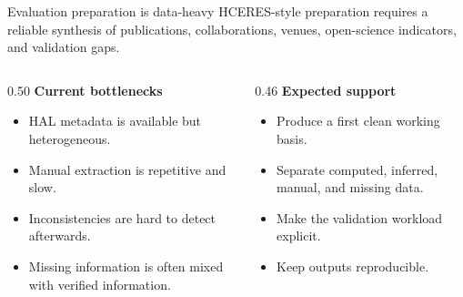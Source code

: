 \begin{frame}[t]

  \begin{block}{Evaluation preparation is data-heavy}
    HCERES-style preparation requires a reliable synthesis of publications, collaborations, venues, open-science indicators, and validation gaps.
  \end{block}

  \vspace{0.3cm}

  \begin{columns}[T,onlytextwidth]
    \begin{column}{0.50\textwidth}
      \textbf{Current bottlenecks}
      \begin{itemize}
        \item HAL metadata is available but heterogeneous.
        \item Manual extraction is repetitive and slow.
        \item Inconsistencies are hard to detect afterwards.
        \item Missing information is often mixed with verified information.
      \end{itemize}
    \end{column}

    \begin{column}{0.46\textwidth}
      \textbf{Expected support}
      \begin{itemize}
        \item Produce a first clean working basis.
        \item Separate computed, inferred, manual, and missing data.
        \item Make the validation workload explicit.
        \item Keep outputs reproducible.
      \end{itemize}
    \end{column}
  \end{columns}
\end{frame}

